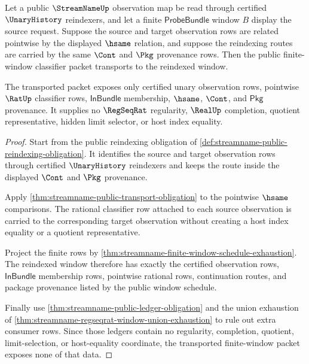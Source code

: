 \begin{theorem}
\label{thm:streamname-pointwise-hsame-reindexing-stability}
Let a public $\StreamNameUp$ observation map be read through certified
$\UnaryHistory$ reindexers, and let a finite $\mathsf{ProbeBundle}$ window
$B$ display the source request. Suppose the source and target observation
rows are related pointwise by the displayed $\hsame$ relation, and suppose the
reindexing routes are carried by the same $\Cont$ and $\Pkg$ provenance rows.
Then the public finite-window classifier packet transports to the reindexed
window.

The transported packet exposes only certified unary observation rows,
pointwise $\RatUp$ classifier rows, $\mathsf{InBundle}$ membership,
$\hsame$, $\Cont$, and $\mathsf{Pkg}$ provenance. It supplies no
$\RegSeqRat$ regularity, $\RealUp$ completion, quotient representative,
hidden limit selector, or host index equality.
\end{theorem}
\begin{proof}
Start from the public reindexing obligation of
\autoref{def:streamname-public-reindexing-obligation}. It identifies the
source and target observation rows through certified $\UnaryHistory$
reindexers and keeps the route inside the displayed $\Cont$ and $\Pkg$
provenance.

Apply \autoref{thm:streamname-public-transport-obligation} to the pointwise
$\hsame$ comparisons. The rational classifier row attached to each source
observation is carried to the corresponding target observation without
creating a host index equality or a quotient representative.

Project the finite rows by
\autoref{thm:streamname-finite-window-schedule-exhaustion}. The reindexed
window therefore has exactly the certified observation rows,
$\mathsf{InBundle}$ membership rows, pointwise rational rows, continuation
routes, and package provenance listed by the public window schedule.

Finally use \autoref{thm:streamname-public-ledger-obligation} and the union
exhaustion of \autoref{thm:streamname-regseqrat-window-union-exhaustion} to
rule out extra consumer rows. Since those ledgers contain no regularity,
completion, quotient, limit-selection, or host-equality coordinate, the
transported finite-window packet exposes none of that data.
\end{proof}

